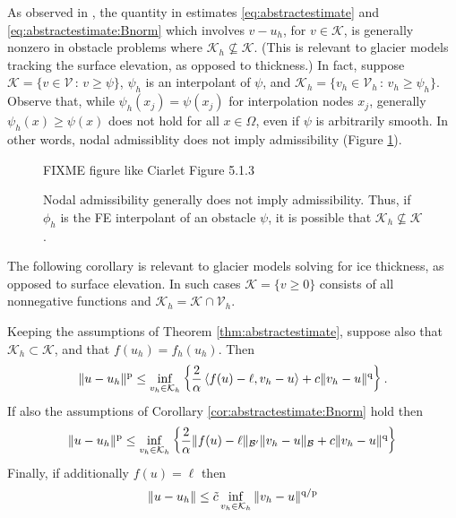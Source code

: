 \documentclass[hidelinks,onefignum,onetabnum,final]{siamart220329}  %
\newcommand{\cB}{\mathcal{B}}
\newcommand{\cK}{\mathcal{K}}
\newcommand{\cV}{\mathcal{V}}
\newcommand{\pp}{{\text{\textnormal{p}}}}
\newcommand{\qq}{{\text{\textnormal{q}}}}
\newcommand{\ip}[2]{\left<#1,#2\right>}
\begin{document}
As observed in \cite{Ciarlet2002}, the quantity in estimates \eqref{eq:abstractestimate} and \eqref{eq:abstractestimate:Bnorm} which involves $v-u_h$, for $v\in\cK$, is generally nonzero in obstacle problems where $\cK_h \nsubseteq \cK$.  (This is relevant to glacier models tracking the surface elevation, as opposed to thickness.)  In fact, suppose $\cK=\{v \in \cV\,:\,v\ge \psi\}$, $\psi_h$ is an interpolant of $\psi$, and $\cK_h=\{v_h \in \cV_h\,:\,v_h\ge \psi_h\}$.  Observe that, while $\psi_h(x_j)=\psi(x_j)$ for interpolation nodes $x_j$, generally $\psi_h(x) \ge \psi(x)$ does not hold for all $x\in\Omega$, even if $\psi$ is arbitrarily smooth.  In other words, nodal admissiblity does not imply admissibility (Figure \ref{fig:nonadmissible}).

\begin{figure}
\begin{center}
FIXME figure like Ciarlet Figure 5.1.3 %
\end{center}
\caption{Nodal admissibility generally does not imply admissibility.  Thus, if $\phi_h$ is the FE interpolant of an obstacle $\psi$, it is possible that $\cK_h \nsubseteq \cK$.}
\label{fig:nonadmissible}
\end{figure}

The following corollary is relevant to glacier models solving for ice thickness, as opposed to surface elevation.  In such cases $\cK = \{v\ge 0\}$ consists of all nonnegative functions and $\cK_h=\cK\cap\cV_h$.

\begin{corollary}  \label{cor:abstractestimate:subset}  Keeping the assumptions of Theorem \ref{thm:abstractestimate}, suppose also that $\cK_h \subset \cK$, and that $f(u_h)=f_h(u_h)$.  Then
\begin{equation}
\|u-u_h\|^\pp \le  \inf_{v_h\in\cK_h} \left\{\frac{2}{\alpha} \ip{f(u)-\ell}{v_h-u} + c \|v_h - u\|^\qq\right\}. \label{eq:abstractestimate:subset}
\end{equation}
If also the assumptions of Corollary \ref{cor:abstractestimate:Bnorm} hold then
\begin{equation}
\|u-u_h\|^\pp \le \inf_{v_h\in\cK_h} \left\{\frac{2}{\alpha} \|f(u)-\ell\|_{\cB'} \|v_h-u\|_{\cB} + c \|v_h-u\|^\qq\right\} \label{eq:abstractestimate:subset:Bnorm}
\end{equation}
Finally, if additionally $f(u)=\ell$ then
\begin{equation}
\|u-u_h\| \le \tilde c \inf_{v_h\in\cK_h} \|v_h-u\|^{\qq/\pp} \label{eq:abstractestimate:subset:Cea}
\end{equation}
\end{corollary}
\end{document}
